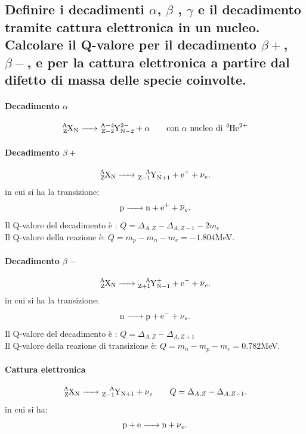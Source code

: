 \subsection[]{ Definire i decadimenti $\alpha$, $\beta$ , $\gamma$ e il decadimento tramite cattura elettronica in un nucleo. Calcolare il Q-valore per il decadimento $\beta+$, $\beta-$, e per la cattura elettronica a partire dal difetto di massa delle specie coinvolte.} \label{sec:decadimenti}
\paragraph{Decadimento $\alpha$}
\[
	\ce{ \ce{^{A}_{Z}X_{N}} -> \ce{^{A-4}_{Z-2}Y^{2-}_{N-2} + \alpha}} \quad \quad \text{con $\alpha$ nucleo di  \ce{^{4}_{}He^{2+}_{}}}
\]
\paragraph{Decadimento $\beta+$}
\[
	\ce{\ce{^{A}_{Z}X_{N}} -> \ce{^{A}_{Z-1}Y^{-}_{N+1}} + e^{+} + \nu_{e} }
.\]
in cui si ha la transizione:
\[
	\ce{p -> n + e^+ + \overline{\nu}_e}
.\]
Il Q-valore del decadimento è : $Q = \Delta_{A,Z} - \Delta_{A, Z-1} - 2m_e $\\
Il Q-valore della reazione è: $ Q = m_p - m_n - m_e = - 1.804 $MeV.

\paragraph{Decadimento $\beta-$}
\[
	\ce{\ce{^{A}_{Z}X_{N}} -> \ce{^{A}_{Z+1}Y^{+}_{N-1}} + e^{-} + \overline{\nu}_{e} }
.\]
in cui si ha la transizione:
\[
	\ce{n -> p + e^- + \nu_e}
.\]
Il Q-valore del decadimento è : $Q = \Delta_{A,Z} - \Delta_{A, Z+1} $\\
Il Q-valore della reazione di transizione è: $ Q = m_n - m_p - m_e = 0.782 $MeV.
\paragraph{Cattura elettronica}
\[
	\ce{\ce{^{A}_{Z}X_{N}} -> \ce{^{A}_{Z-1}Y_{N+1}} + \nu_e} \quad \quad Q = \Delta_{A,Z} - \Delta_{A, Z-1} 
.\] 
in cui si ha:
\[
\ce{p + e ->n + \nu_e }
.\] 

